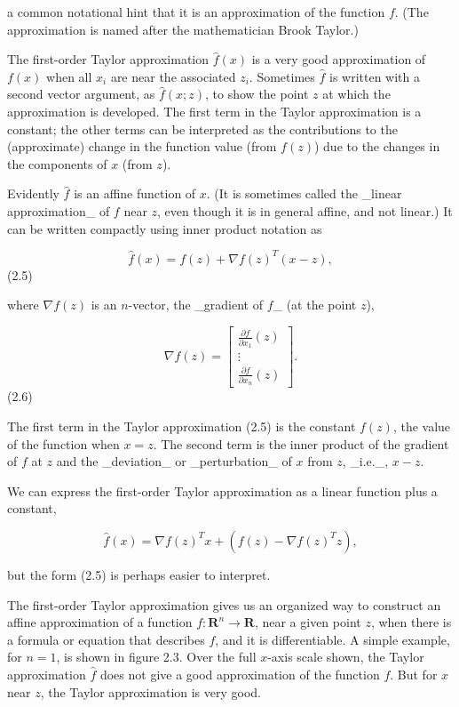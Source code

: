 a common notational hint that it is an approximation of the function \(f\). (The approximation is named after the mathematician Brook Taylor.)

The first-order Taylor approximation \(\hat{f}(x)\) is a very good approximation of \(f(x)\) when all \(x_{i}\) are near the associated \(z_{i}\). Sometimes \(\hat{f}\) is written with a second vector argument, as \(\hat{f}(x;z)\), to show the point \(z\) at which the approximation is developed. The first term in the Taylor approximation is a constant; the other terms can be interpreted as the contributions to the (approximate) change in the function value (from \(f(z)\)) due to the changes in the components of \(x\) (from \(z\)).

Evidently \(\hat{f}\) is an affine function of \(x\). (It is sometimes called the _linear approximation_ of \(f\) near \(z\), even though it is in general affine, and not linear.) It can be written compactly using inner product notation as

\[\hat{f}(x)=f(z)+\nabla f(z)^{T}(x-z),\] (2.5)

where \(\nabla f(z)\) is an \(n\)-vector, the _gradient of \(f\)_ (at the point \(z\)),

\[\nabla f(z)=\left[\begin{array}{c}\frac{\partial f}{\partial x_{1}}(z)\\ \vdots\\ \frac{\partial f}{\partial x_{n}}(z)\end{array}\right].\] (2.6)

The first term in the Taylor approximation (2.5) is the constant \(f(z)\), the value of the function when \(x=z\). The second term is the inner product of the gradient of \(f\) at \(z\) and the _deviation_ or _perturbation_ of \(x\) from \(z\), _i.e._, \(x-z\).

We can express the first-order Taylor approximation as a linear function plus a constant,

\[\hat{f}(x)=\nabla f(z)^{T}x+(f(z)-\nabla f(z)^{T}z),\]

but the form (2.5) is perhaps easier to interpret.

The first-order Taylor approximation gives us an organized way to construct an affine approximation of a function \(f:\mathbf{R}^{n}\to\mathbf{R}\), near a given point \(z\), when there is a formula or equation that describes \(f\), and it is differentiable. A simple example, for \(n=1\), is shown in figure 2.3. Over the full \(x\)-axis scale shown, the Taylor approximation \(\hat{f}\) does not give a good approximation of the function \(f\). But for \(x\) near \(z\), the Taylor approximation is very good.

